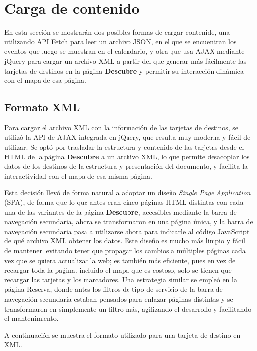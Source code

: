 \documentclass[11pt, a4paper]{book}
\begin{document}
	\section{Carga de contenido}
	En esta sección se mostrarán dos posibles formas de cargar contenido, una utilizando API Fetch para leer un archivo JSON, en el que se encuentran los eventos que luego se muestran en el calendario, y otra que usa AJAX mediante jQuery para cargar un archivo XML a partir del que generar más fácilmente las tarjetas de destinos en la página \textbf{Descubre} y permitir su interacción dinámica con el mapa de esa página.
	\subsection{Formato XML}

    Para cargar el archivo XML con la información de las tarjetas de destinos, se utilizó la API de AJAX integrada en jQuery, que resulta muy moderna y fácil de utilizar. Se optó por trasladar la estructura y contenido de las tarjetas desde el HTML de la página \textbf{Descubre} a un archivo XML, lo que permite desacoplar los datos de los destinos de la estructura y presentación del documento, y facilita la interactividad con el mapa de esa misma página.

    Esta decisión llevó de forma natural a adoptar un diseño \textit{Single Page Application} (SPA), de forma que lo que antes eran cinco páginas HTML distintas con cada una de las variantes de la página \textbf{Descubre}, accesibles mediante la barra de navegación secundaria, ahora se transformaron en una página única, y la barra de navegación secundaria pasa a utilizarse ahora para indicarle al código JavaScript de qué archivo XML obtener los datos. Este diseño es mucho más limpio y fácil de mantener, evitando tener que propagar los cambios a múltiples páginas cada vez que se quiera actualizar la web; es también más eficiente, pues en vez de recargar toda la paǵina, incluido el mapa que es costoso, solo se tienen que recargar las tarjetas y los marcadores. Una estrategia similar se empleó en la página Reserva, donde antes los filtros de tipo de servicio de la barra de navegación secundaria estaban pensados para enlazar páginas distintas y se transformaron en simplemente un filtro más, agilizando el desarrollo y facilitando el mantenimiento.

    A continuación se muestra el formato utilizado para una tarjeta de destino en XML.
\end{document}
